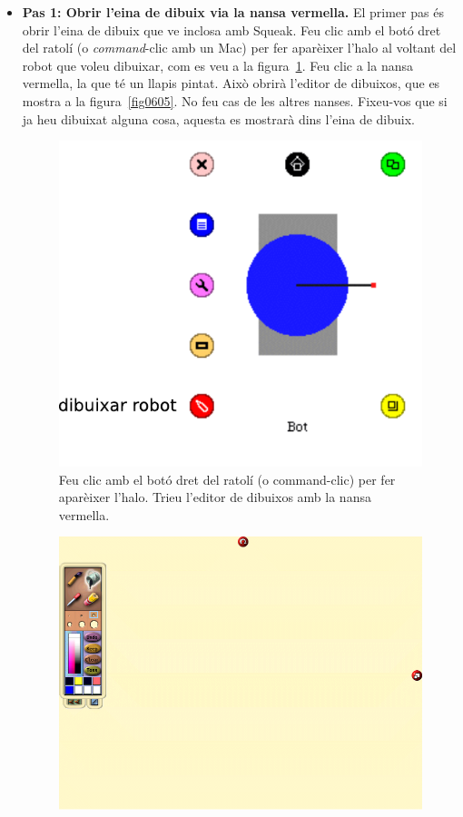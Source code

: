 \begin{itemize}
\item[] \textbf{Pas 1: Obrir l'eina de dibuix via la nansa vermella.} El primer pas és obrir l'eina de dibuix que ve inclosa amb Squeak. Feu clic amb el botó dret del ratolí (o \emph{command}-clic amb un Mac) per fer aparèixer l'halo al voltant del robot que voleu dibuixar, com es veu a la figura~\ref{fig0604}. Feu clic a la nansa vermella, la que té un llapis pintat. Això obrirà l'editor de dibuixos, que es mostra a la figura~\ref{fig0605}. No feu cas de les altres nanses. Fixeu-vos que si ja heu dibuixat alguna cosa, aquesta es mostrarà dins l'eina de dibuix.
\begin{figure}[h]
\begin{center}
\includegraphics[scale=0.75]{Imatges/figura6-4}
\end{center}
\caption{Feu clic amb el botó dret del ratolí (o command-clic)
per fer aparèixer l'halo. Trieu l'editor de dibuixos amb la nansa vermella.}
\label{fig0604}
\end{figure}
\begin{figure}[h]
\begin{center}
\includegraphics[scale=1]{Imatges/figura6-5.png} 

\end{center}
\end{figure}
\end{itemize}

